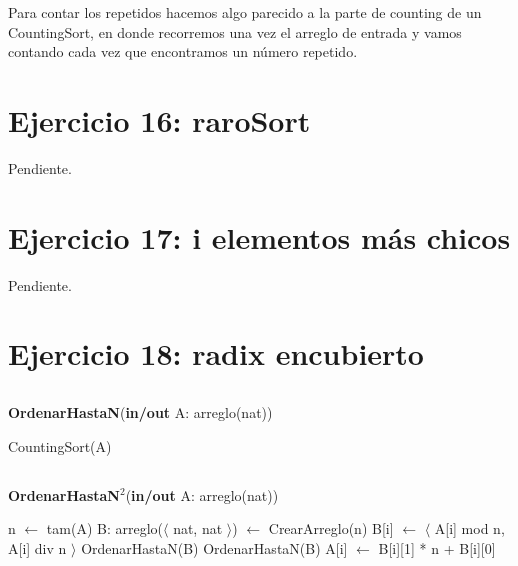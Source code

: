Para contar los repetidos hacemos algo parecido a la parte de counting de un CountingSort, en donde recorremos una vez el arreglo de entrada y vamos contando cada vez que encontramos un número repetido.

\section{Ejercicio 16: raroSort}

Pendiente.

\section{Ejercicio 17: i elementos más chicos}

Pendiente.

\section{Ejercicio 18: radix encubierto}

\subsection{}

\begin{algorithm}[H]
\caption{
    \textbf{OrdenarHastaN}(\textbf{in/out} A: arreglo(nat))
}
\begin{algorithmic}[1]
    \State CountingSort(A) 
\end{algorithmic}
\end{algorithm}

\subsection{}

\begin{algorithm}[H]
\caption{
    \textbf{OrdenarHastaN$^2$}(\textbf{in/out} A: arreglo(nat))
}
\begin{algorithmic}[1]
    \State n $\gets$ tam(A)
    \State B: arreglo($\langle$ nat, nat $\rangle$) $\gets$ CrearArreglo(n) 
     
        \State B[i] $\gets$ $\langle$ A[i] mod n, A[i] div n $\rangle$
    \EndFor
    \State OrdenarHastaN(B) 
    \State OrdenarHastaN(B) 
     
        \State A[i] $\gets$ B[i][1] * n + B[i][0]
    \EndFor
\end{algorithmic}
\end{algorithm}

